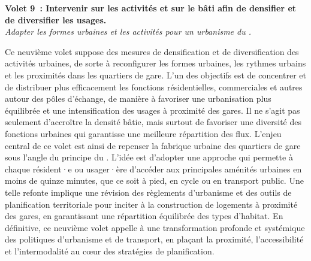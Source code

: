\begin{refsegment}
    \begin{displayquote}
\textbf{Volet 9~: Intervenir sur les activités et sur le bâti afin de densifier et de diversifier les usages.}
\\
\textsl{Adapter les formes urbaines et les activités pour un urbanisme du .}
    \end{displayquote}
Ce neuvième volet suppose des mesures de densification et de diversification des activités urbaines, de sorte à reconfigurer les formes urbaines, les rythmes urbains et les proximités dans les quartiers de gare. L’un des objectifs est de concentrer et de distribuer plus efficacement les fonctions résidentielles, commerciales et autres autour des pôles d’échange, de manière à favoriser une urbanisation plus équilibrée et une intensification des usages à proximité des gares. Il ne s’agit pas seulement d’accroître la densité bâtie, mais surtout de favoriser une diversité des fonctions urbaines qui garantisse une meilleure répartition des flux. L’enjeu central de ce volet est ainsi de repenser la fabrique urbaine des quartiers de gare sous l’angle du principe du . L’idée est d’adopter une approche qui permette à chaque résident·e ou usager·ère d’accéder aux principales aménités urbaines en moins de quinze minutes, que ce soit à pied, en cycle ou en transport public. Une telle refonte implique une révision des règlements d’urbanisme et des outils de planification territoriale pour inciter à la construction de logements à proximité des gares, en garantissant une répartition équilibrée des types d’habitat. En définitive, ce neuvième volet appelle à une transformation profonde et systémique des politiques d’urbanisme et de transport, en plaçant la proximité, l’accessibilité et l’intermodalité au cœur des stratégies de planification.%


\end{refsegment}
